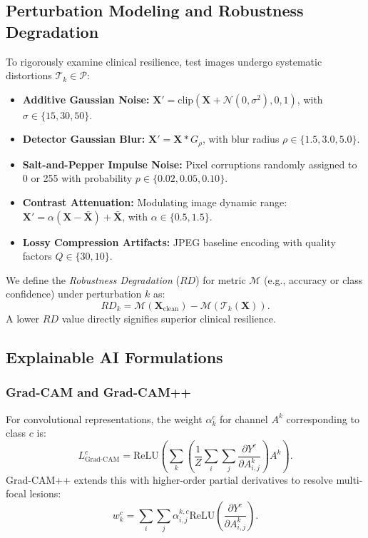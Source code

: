 \documentclass[journal]{IEEEtran}
\begin{document}
\subsection{Perturbation Modeling and Robustness Degradation}
To rigorously examine clinical resilience, test images undergo systematic distortions $\mathcal{T}_k \in \mathcal{P}$:
\begin{itemize}
    \item \textbf{Additive Gaussian Noise:} $\mathbf{X}' = \text{clip}(\mathbf{X} + \mathcal{N}(0, \sigma^2), 0, 1)$, with $\sigma \in \{15, 30, 50\}$.
    \item \textbf{Detector Gaussian Blur:} $\mathbf{X}' = \mathbf{X} * G_\rho$, with blur radius $\rho \in \{1.5, 3.0, 5.0\}$.
    \item \textbf{Salt-and-Pepper Impulse Noise:} Pixel corruptions randomly assigned to 0 or 255 with probability $p \in \{0.02, 0.05, 0.10\}$.
    \item \textbf{Contrast Attenuation:} Modulating image dynamic range: $\mathbf{X}' = \alpha(\mathbf{X} - \bar{\mathbf{X}}) + \bar{\mathbf{X}}$, with $\alpha \in \{0.5, 1.5\}$.
    \item \textbf{Lossy Compression Artifacts:} JPEG baseline encoding with quality factors $Q \in \{30, 10\}$.
\end{itemize}

We define the \textit{Robustness Degradation} ($RD$) for metric $\mathcal{M}$ (e.g., accuracy or class confidence) under perturbation $k$ as:
\begin{equation}
RD_k = \mathcal{M}(\mathbf{X}_{\text{clean}}) - \mathcal{M}(\mathcal{T}_k(\mathbf{X})).
\end{equation}
A lower $RD$ value directly signifies superior clinical resilience.

\subsection{Explainable AI Formulations}
\subsubsection{Grad-CAM and Grad-CAM++}
For convolutional representations, the weight $\alpha_k^c$ for channel $A^k$ corresponding to class $c$ is:
\begin{equation}
L_{\text{Grad-CAM}}^c = \text{ReLU}\left(\sum_k \left( \frac{1}{Z} \sum_i \sum_j \frac{\partial Y^c}{\partial A_{i,j}^k} \right) A^k \right).
\end{equation}
Grad-CAM++ extends this with higher-order partial derivatives to resolve multi-focal lesions:
\begin{equation}
w_k^c = \sum_i \sum_j \alpha_{i,j}^{k,c} \text{ReLU}\left(\frac{\partial Y^c}{\partial A_{i,j}^k}\right).
\end{equation}
\end{document}
